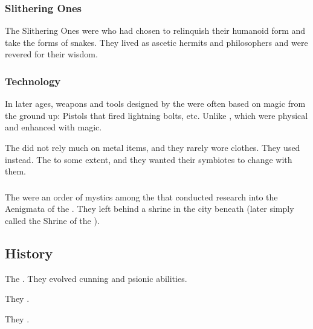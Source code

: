 \subsubsection{Slithering Ones}
The Slithering Ones were \caisith who had chosen to relinquish their humanoid form and take the forms of snakes.
They lived as ascetic hermits and philosophers and were revered for their wisdom. 





\subsubsection{Technology}
In later ages, weapons and tools designed by the \quiljaaran{} were often based on magic from the ground up: 
Pistols that fired lightning bolts, etc. 
Unlike , which were physical and enhanced with magic. 

The \quiljaaran did not rely much on metal items, and they rarely wore clothes.
They used  instead. 
The \quiljaaran {} to some extent, and they wanted their symbiotes to change with them. 





\subsubsection{\UzulKaya}
The \UzulKaya were an order of mystics among the \ophidians that conducted research into the Aenigmata of the \xss. 
They left behind a shrine in the city beneath \Yormis (later simply called the Shrine of the \UzulKaya). 









\subsection{History}

The \ophidians{} . 
They evolved cunning and psionic abilities. 

They . 

They . 

